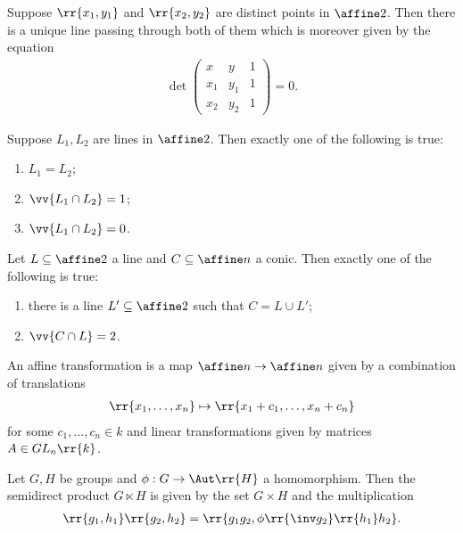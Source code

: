 \documentclass{article}
\begin{document}
\begin{proposition}
  Suppose $\rr{x_1,y_1}$ and $\rr{x_2,y_2}$ are distinct points in $\affine 2$. Then
  there is a unique line passing through both of them which is moreover given by the
  equation
  \begin{align*}
    \det\begin{pmatrix}
      x   & y   & 1 \\
      x_1 & y_1 & 1 \\
      x_2 & y_2 & 1
    \end{pmatrix}
    = 0.
  \end{align*}
\end{proposition}

\begin{proposition}
  Suppose $L_1,L_2$ are lines in $\affine 2$. Then exactly one of the following is true:
  \begin{enumerate}
    \item $L_1=L_2$;
    \item $\vv{L_1\cap L_2}=1$;
    \item $\vv{L_1\cap L_2}=0$.
  \end{enumerate}
\end{proposition}

\begin{proposition}
  Let $L\subseteq\affine 2$ a line and $C\subseteq\affine n$ a conic. Then
  exactly one of the following is true:
  \begin{enumerate}
    \item there is a line $L'\subseteq\affine 2$ such that $C=L\cup L'$;
    \item $\vv{C\cap L}=2$.
  \end{enumerate}
\end{proposition}

\begin{definition}
  An affine transformation is a map $\affine n\to\affine n$ given by a combination of
  translations
  \begin{align*}
    \rr{x_1,\ldots,x_n} \mapsto \rr{x_1 + c_1,\ldots,x_n+c_n}
  \end{align*}
  for some $c_1,\ldots,c_n\in k$ and linear transformations given by matrices $A\in GL_n\rr{k}$.
\end{definition}

\begin{definition}
  Let $G,H$ be groups and $\phi:G\to\Aut\rr{H}$ a homomorphism.
  Then the semidirect product $G\ltimes H$ is given by the set $G\times H$ and
  the multiplication
  \begin{align*}
    \rr{g_1,h_1}\rr{g_2,h_2} = \rr{g_1g_2,\phi\rr{\inv g_2}\rr{h_1}h_2}.
  \end{align*}
\end{definition}
\end{document}

